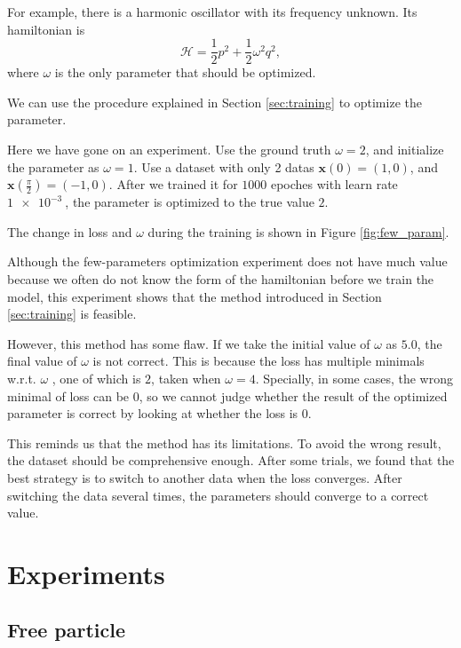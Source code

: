 \documentclass{article}
\begin{document}
For example, there is a harmonic oscillator with its frequency unknown.
Its hamiltonian is
\begin{equation}
	\mathcal H=\frac12p^2+\frac12\omega^2q^2,
\end{equation}
where $\omega$ is the only parameter that should be optimized.

We can use the procedure explained in Section \ref{sec:training}
to optimize the parameter.

Here we have gone on an experiment.
Use the ground truth $\omega=2$, and initialize the parameter as $\omega=1$.
Use a dataset with only 2 datas $\mathbf x\left(0\right)=\left(1,0\right)$,
and $\mathbf x\left(\frac\pi2\right)=\left(-1,0\right)$.
After we trained it for $1000$ epoches with learn rate $\SI{1e-3}{}$,
the parameter is optimized to the true value $2$.

The change in loss and $\omega$ during the training is shown in Figure \ref{fig:few_param}.

Although the few-parameters optimization experiment does not have much value
because we often do not know the form of the hamiltonian before we train the model,
this experiment shows that the method introduced in Section \ref{sec:training} is feasible.

However, this method has some flaw. If we take the initial value of $\omega$ as $5.0$,
the final value of $\omega$ is not correct.
This is because the loss has multiple minimals w.r.t. $\omega$ \cite[p. 121]{reed1999smithing},
one of which is $2$, taken when $\omega=4$.
Specially, in some cases, the wrong minimal of loss can be $0$,
so we cannot judge whether the result of the optimized parameter is correct
by looking at whether the loss is $0$.

This reminds us that the method has its limitations.
To avoid the wrong result, the dataset should be comprehensive enough.
After some trials, we found that the best strategy is to switch to another data
when the loss converges.
After switching the data several times,
the parameters should converge to a correct value.

\section{Experiments}

\subsection{Free particle}
\end{document}
